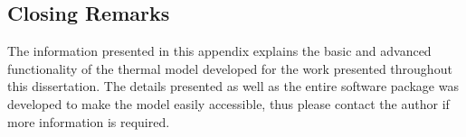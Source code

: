 \subsection{Closing Remarks}
The information presented in this appendix explains the basic and advanced functionality of the thermal model developed for the work presented throughout this dissertation.  The details presented as well as the entire software package was developed to make the model easily accessible, thus please contact the author if more information is required.
